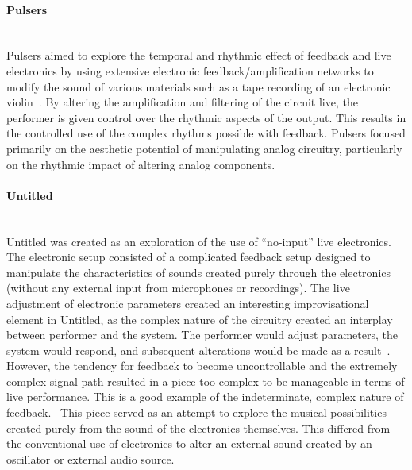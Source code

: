 \documentclass[titlepage]{scrartcl}
\begin{document}
    \paragraph{Pulsers}\mbox{}\\
    Pulsers aimed to explore the temporal and rhythmic effect of feedback and
    live electronics by using extensive electronic feedback/amplification
    networks to modify the sound of various materials such as a tape recording
    of an electronic violin~\parencite{tudor1984twle}. By altering the amplification and filtering of the
    circuit live, the performer is given control over the rhythmic aspects of
    the output. This results in the controlled use of the complex rhythms
    possible with feedback.
    Pulsers focused primarily on the aesthetic potential of manipulating analog
    circuitry, particularly on the rhythmic impact of altering analog
    components.
    
    \paragraph{Untitled}\mbox{}\\
    Untitled was created as an exploration of the use of ``no-input'' live
    electronics. The electronic setup consisted of a complicated feedback setup
    designed to manipulate the characteristics of sounds created purely through
    the electronics (without any external input from microphones or
    recordings).
    The live adjustment of electronic parameters created an interesting
    improvisational element in Untitled, as the complex nature of the
    circuitry created an interplay between performer and the system. The
    performer would adjust parameters, the system would respond, and subsequent
    alterations would be made as a result~\parencite{tudor1984twle}.
    However, the tendency for feedback to become uncontrollable and the
    extremely complex signal path resulted in a piece too complex to be
    manageable in terms of live performance. This is a good example of the
    indeterminate, complex nature of
    feedback.~\parencite[p.83-85]{weisert2010ioi}
    This piece served as an attempt to explore the musical possibilities
    created purely from the sound of the electronics themselves. This differed
    from the conventional use of electronics to alter an external sound created
    by an oscillator or external audio source.~\parencite{tudor1984twle}
\end{document}
